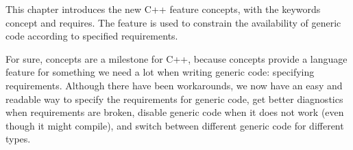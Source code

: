 This chapter introduces the new C++ feature concepts, with the keywords concept and requires. The feature is used to constrain the availability of generic code according to specified requirements.

For sure, concepts are a milestone for C++, because concepts provide a language feature for something we need a lot when writing generic code: specifying requirements. Although there have been workarounds, we now have an easy and readable way to specify the requirements for generic code, get better diagnostics when requirements are broken, disable generic code when it does not work (even though it might compile), and switch between different generic code for different types.